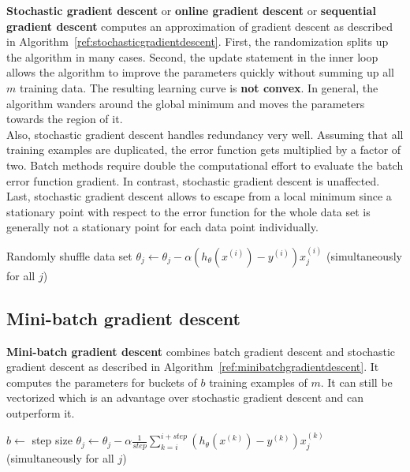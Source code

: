 \documentclass{report}
\begin{document}
{\bf Stochastic gradient descent} or {\bf online gradient descent} or {\bf sequential gradient descent} computes an approximation of gradient descent as described in Algorithm~\ref{ref:stochasticgradientdescent}.
First, the randomization splits up the algorithm in many cases.
Second, the update statement in the inner loop allows the algorithm to improve the parameters quickly without summing up all $m$ training data.
The resulting learning curve is {\bf not convex}.
In general, the algorithm wanders around the global minimum and moves the parameters towards the region of it. \\
Also, stochastic gradient descent handles redundancy very well. Assuming that all training examples are duplicated, the error function gets multiplied by a factor of two. Batch methods require double the computational effort to evaluate the batch error function gradient. In contrast, stochastic gradient descent is unaffected.
Last, stochastic gradient descent allows to escape from a local minimum since a stationary point with respect to the error function for the whole data set is generally not a stationary point for each data point individually.

\begin{algorithm}
\caption{Stochastic gradient descent}
\label{ref:stochasticgradientdescent}
\begin{algorithmic}
\State Randomly shuffle data set
\Repeat
{}
\State $\theta_j  \gets \theta_j - \alpha (h_\theta(x^{(i)})-y^{(i)})x_j^{(i)}$ (simultaneously for all $j$)
\EndFor
{}
\end{algorithmic}
\end{algorithm}


\subsection{Mini-batch gradient descent}
{\bf Mini-batch gradient descent} combines batch gradient descent and stochastic gradient descent as described in Algorithm~\ref{ref:minibatchgradientdescent}. It computes the parameters for buckets of $b$ training examples of $m$. It can still be vectorized which is an advantage over stochastic gradient descent and can outperform it.

\begin{algorithm}
\caption{Mini-batch gradient descent}
\label{ref:minibatchgradientdescent}
\begin{algorithmic}
\State $b\gets $ step size
\Repeat
{}
\State $\theta_j  \gets \theta_j - \alpha \frac{1}{step}\sum_{k=i}^{i+step} (h_\theta(x^{(k)})-y^{(k)})x_j^{(k)}$ (simultaneously for all $j$)
\EndFor
{}
\end{algorithmic}
\end{algorithm}
\end{document}
